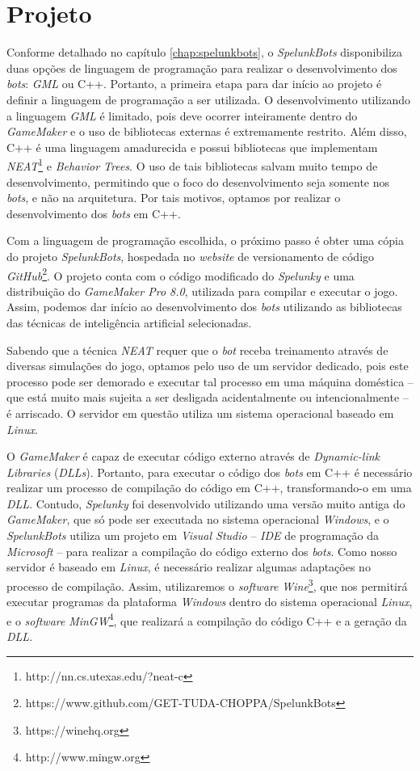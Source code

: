 \chapter{\label{chap:project}Projeto} 
Conforme detalhado no capítulo \ref{chap:spelunkbots}, o \textit{SpelunkBots}
disponibiliza duas opções de linguagem de programação para realizar o
desenvolvimento dos \textit{bots}: \textit{GML} ou C++. Portanto, a primeira
etapa para dar início ao projeto é definir a linguagem de programação a ser
utilizada. O desenvolvimento utilizando a linguagem \textit{GML} é limitado,
pois deve ocorrer inteiramente dentro do \textit{GameMaker} e o uso de
bibliotecas externas é extremamente restrito. Além disso, C++ é uma linguagem
amadurecida e possui bibliotecas que implementam
\textit{NEAT}\footnote{http://nn.cs.utexas.edu/?neat-c} e \textit{Behavior
Trees}. O uso de tais bibliotecas salvam muito tempo de desenvolvimento,
permitindo que o foco do desenvolvimento seja somente nos \textit{bots}, e não
na arquitetura. Por tais motivos, optamos por realizar o desenvolvimento dos
\textit{bots} em C++.

Com a linguagem de programação escolhida, o próximo passo é obter uma cópia do
projeto \textit{SpelunkBots}, hospedada no \textit{website} de versionamento de
código
\textit{GitHub}\footnote{https://www.github.com/GET-TUDA-CHOPPA/SpelunkBots}. O
projeto conta com o código modificado do \textit{Spelunky} e uma distribuição do
\textit{GameMaker Pro 8.0}, utilizada para compilar e executar o jogo. Assim,
podemos dar início ao desenvolvimento dos \textit{bots} utilizando as bibliotecas
das técnicas de inteligência artificial selecionadas.

Sabendo que a técnica \textit{NEAT} requer que o \textit{bot} receba treinamento
através de diversas simulações do jogo, optamos pelo uso de um servidor
dedicado, pois este processo pode ser demorado e executar tal processo em uma
máquina doméstica -- que está muito mais sujeita a ser desligada acidentalmente
ou intencionalmente -- é arriscado. O servidor em questão utiliza um sistema
operacional baseado em \textit{Linux}.

O \textit{GameMaker} é capaz de executar código externo através de
\textit{Dynamic-link Libraries} (\textit{DLLs}). Portanto, para executar o
código dos \textit{bots} em C++ é necessário realizar um processo de compilação
do código em C++, transformando-o em uma \textit{DLL}. Contudo,
\textit{Spelunky} foi desenvolvido utilizando uma versão muito antiga do
\textit{GameMaker}, que só pode ser executada no sistema operacional
\textit{Windows}, e o \textit{SpelunkBots} utiliza um projeto em
\textit{Visual Studio} -- \textit{IDE} de programação da \textit{Microsoft}
-- para realizar a compilação do código externo dos \textit{bots}. Como
nosso servidor é baseado em \textit{Linux}, é necessário realizar algumas
adaptações no processo de compilação. Assim, utilizaremos o \textit{software}
\textit{Wine}\footnote{https://winehq.org}, que nos permitirá executar programas
da plataforma \textit{Windows} dentro do sistema operacional \textit{Linux}, e o
\textit{software} \textit{MinGW}\footnote{http://www.mingw.org}, que realizará a
compilação do código C++ e a geração da \textit{DLL}.
